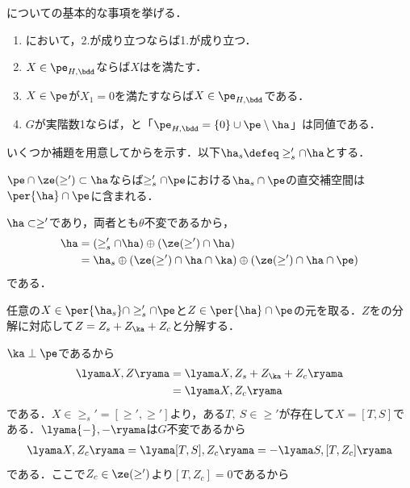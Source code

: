 についての基本的な事項を挙げる．

\begin{lem}\label{lem:basic-prob}
  \leavevmode\vspace{-1em}
  \begin{enumerate}[label=\textbf{\arabic*.}]
  \item {}において，2.が成り立つならば1.が成り立つ．
  \item $X\in \pe_{H,\bdd} $ならば$X$はを満たす．
  \item $X \in \pe $が$X_1 = 0$を満たすならば$X\in \pe_{H,\bdd} $である．
  \item $G$が実階数1ならば，と「$\pe_{H,\bdd} =  \{0\}\cup \pe\setminus\ha $」は同値である．
  \end{enumerate}
\end{lem}

いくつか補題を用意してからを示す．以下$\ha_s\defeq \ge_{s}'\cap\ha $とする．
\begin{lem}\label{lem:0117-perp}
  $\pe\cap \ze(\ge')\subset \ha $ならば$\ge'_s\cap\pe $における$\ha_s\cap \pe$の直交補空間は$\per{\ha}\cap\pe $に含まれる．
\end{lem}
\begin{npfwn}
  $\ha\subset \ge' $であり，両者とも$\theta$不変であるから，
  \begin{align}
    \ha &= (\ge'_s\cap \ha)\oplus (\ze(\ge')\cap\ha )\notag \\
        &= \ha_s\oplus (\ze(\ge')\cap\ha\cap\ka )\oplus (\ze(\ge')\cap\ha\cap\pe ) \label{eq:0117-perp}
  \end{align}
  である．

  任意の$X\in \per{\ha_s}\cap \ge'_s\cap\pe $と$Z\in \per{\ha}\cap\pe $の元を取る．$Z$をの分解に対応して$Z = Z_s + Z_{\ka} + Z_{c} $と分解する．
  
  $\ka\perp\pe $であるから
  \begin{align*}
    \lyama X, Z\ryama &= \lyama X, Z_s + Z_{\ka} + Z_{c}\ryama\\
                      &= \lyama X,   Z_{c}\ryama
  \end{align*}
  である．$X\in \ge_{s}' = [\ge', \ge'] $より，ある$T,\ S\in \ge'$が存在して$X = [T, S] $である．$\lyama {-}, {-}\ryama $は$G$不変であるから
  \begin{align*}
    \lyama X,   Z_{c}\ryama = \lyama [T, S],   Z_{c}\ryama = -\lyama S,   [T, Z_{c}]\ryama
  \end{align*}
  である．ここで$Z_c\in \ze(\ge') $より$[T, Z_c ]= 0$であるから
  
\end{npfwn}

